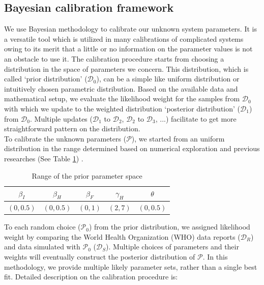 \subsection{Bayesian calibration framework}

We use Bayesian methodology to calibrate our unknown system parameters. It is a versatile tool which is utilized in many calibrations of complicated systems owing to its merit that a little or no information on the parameter values is not an obstacle to use it. The calibration procedure starts from choosing a distribution in the space of parameters we concern. This distribution, which is called `prior distribution' ($\mathcal{D}_0$), can be a simple like uniform distribution or intuitively chosen parametric distribution. Based on the available data and mathematical setup, we evaluate the likelihood weight for the samples from $\mathcal{D}_0$ with which we update to the weighted distribution `posterior distribution' ($\mathcal{D}_1$) from $\mathcal{D}_0$. Multiple updates ($\mathcal{D}_1$ to $\mathcal{D}_2$, $\mathcal{D}_2$ to $\mathcal{D}_3$, ...) facilitate to get more straightforward pattern on the distribution.\\
To calibrate the unknown parameters ($\mathcal{P}$), we started from an uniform distribution in the range determined based on numerical exploration and previous researches (See Table \ref{tab:PriorRanges}) \cite{Rivers2014}. \\

\begin{table}[ht]
\caption{Range of the prior parameter space} %
\centering %
\begin{tabular}{c c c c c}
\hline\hline %
$\beta_{I}$ & $\beta_{H}$ & $\beta_{F}$ & $\gamma_{H}$ & $\theta$ \\ [0.5ex]
\hline %
$(0,0.5)$ & $(0,0.5)$ & $(0,1)$ & $(2,7)$ & $(0,0.5)$ \\ [0.5ex]
\hline
\end{tabular}
\label{tab:PriorRanges}
\end{table}


To each random choice ($\mathcal{P}_0$) from the prior distribution, we assigned likelihood weight by comparing the World Health Organization (WHO) data reports ($\mathcal{D}_R$) and data simulated with $\mathcal{P}_0$ ($\mathcal{D}_S$). Multiple choices of parameters and their weights will eventually construct the posterior distribution of $\mathcal{P}$. In this methodology, we provide multiple likely parameter sets, rather than a single best fit. Detailed description on the calibration procedure is:\\

